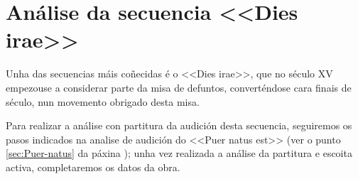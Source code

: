 %
%
\section{Análise da secuencia <<Dies irae>>} \label{Intro}
%
Unha das secuencias máis coñecidas é o <<Dies irae>>, que no século XV empezouse a considerar parte da misa de defuntos, converténdose cara finais de século, nun movemento obrigado desta misa.
\par
\vspace*{0.25cm}
%

%

Para realizar a análise con partitura da audición desta secuencia, seguiremos os pasos indicados na analise de audición do <<Puer natus est>>  (ver o punto \ref{sec:Puer-natus} da páxina \pageref{sec:Puer-natus}); unha vez realizada a análise da partitura e escoita activa, completaremos os datos da obra.
\par
\vspace*{0.15cm}


